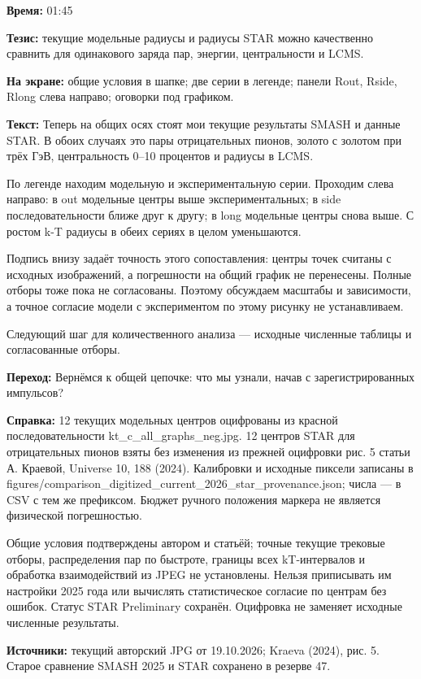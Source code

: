\textbf{Время:} 01:45

\textbf{Тезис:} текущие модельные радиусы и радиусы STAR можно качественно сравнить для одинакового заряда пар, энергии, центральности и LCMS.

\textbf{На экране:} общие условия в шапке; две серии в легенде; панели Rout, Rside, Rlong слева направо; оговорки под графиком.

\textbf{Текст:} Теперь на общих осях стоят мои текущие результаты SMASH и данные STAR. В обоих случаях это пары отрицательных пионов, золото с золотом при трёх ГэВ, центральность 0–10 процентов и радиусы в LCMS.

По легенде находим модельную и экспериментальную серии. Проходим слева направо: в out модельные центры выше экспериментальных; в side последовательности ближе друг к другу; в long модельные центры снова выше. С ростом k-T радиусы в обеих сериях в целом уменьшаются.

Подпись внизу задаёт точность этого сопоставления: центры точек считаны с исходных изображений, а погрешности на общий график не перенесены. Полные отборы тоже пока не согласованы. Поэтому обсуждаем масштабы и зависимости, а точное согласие модели с экспериментом по этому рисунку не устанавливаем.

Следующий шаг для количественного анализа — исходные численные таблицы и согласованные отборы.

\textbf{Переход:} Вернёмся к общей цепочке: что мы узнали, начав с зарегистрированных импульсов?

\textbf{Справка:} 12 текущих модельных центров оцифрованы из красной последовательности kt\_c\_all\_graphs\_neg.jpg. 12 центров STAR для отрицательных пионов взяты без изменения из прежней оцифровки рис. 5 статьи А. Краевой, Universe 10, 188 (2024). Калибровки и исходные пиксели записаны в figures/comparison\_digitized\_current\_2026\_star\_provenance.json; числа — в CSV с тем же префиксом. Бюджет ручного положения маркера не является физической погрешностью.

Общие условия подтверждены автором и статьёй; точные текущие трековые отборы, распределения пар по быстроте, границы всех kT-интервалов и обработка взаимодействий из JPEG не установлены. Нельзя приписывать им настройки 2025 года или вычислять статистическое согласие по центрам без ошибок. Статус STAR Preliminary сохранён. Оцифровка не заменяет исходные численные результаты.

\textbf{Источники:} текущий авторский JPG от 19.10.2026; Kraeva (2024), рис. 5. Старое сравнение SMASH 2025 и STAR сохранено в резерве 47.
